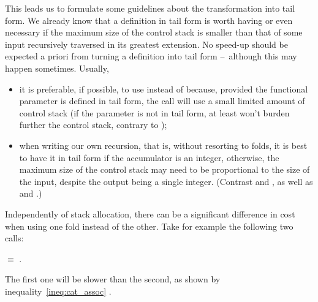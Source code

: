 This leads us to formulate some guidelines about the transformation
into tail form. We already know that a definition in tail form is
worth having or even necessary if the maximum size of the control
stack is smaller than that of some input recursively traversed in its
greatest extension. No speed\hyp{}up should be expected a priori from
turning a definition into tail form --~although this may happen
sometimes. Usually,
\begin{itemize}

  \item it is preferable, if possible, to use  instead
  of  because, provided the functional parameter is
  defined in tail form, the call will use a small limited amount of
  control stack (if the parameter is not in tail form, at least
   won't burden further the control stack, contrary
  to );

  \item when writing our own recursion, that is, without resorting to
  folds, it is best to have it in tail form if the accumulator is an
  integer, otherwise, the maximum size of the control stack may need
  to be proportional to the size of the input, despite the output
  being a single integer. (Contrast  and
  , as well as  and .)

\end{itemize}
Independently of stack allocation, there can be a significant
difference in cost when using one fold instead of the other. Take for
example the following two calls:
\begin{center}
\(\equiv\)
.
\end{center}
The first one will be slower than the second, as shown by
inequality~\eqref{ineq:cat_assoc} .

